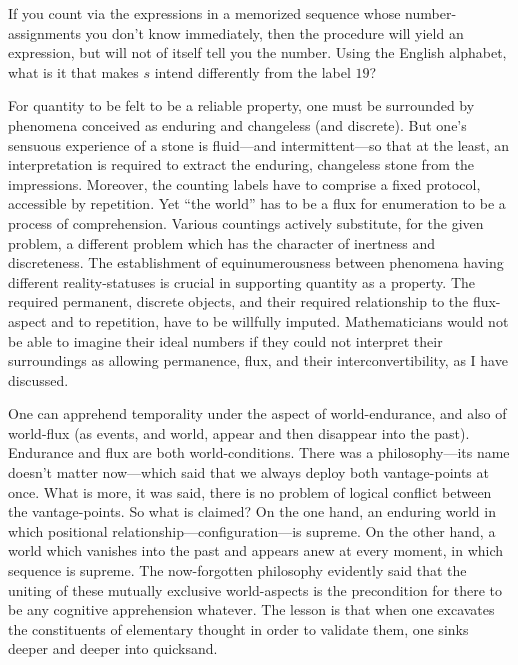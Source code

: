 If you count via the expressions in a memorized sequence whose number-assignments you don't know immediately, then the procedure will yield an expression, but will not of itself tell you the number. Using the English alphabet, what is it that makes $s$ intend differently from the label $19$?

For quantity to be felt to be a reliable property, one must be surrounded by phenomena conceived as enduring and changeless (and discrete). But one's sensuous experience of a stone is fluid---and intermittent---so that at the least, an interpretation is required to extract the enduring, changeless stone from the impressions. Moreover, the counting labels have to comprise a fixed protocol, accessible by repetition. Yet \enquote{the world} has to be a flux for enumeration to be a process of comprehension. Various countings actively substitute, for the given problem, a different problem which has the character of inertness and discreteness. The establishment of equinumerousness between phenomena having different reality-statuses is crucial in supporting quantity as a property. The required permanent, discrete objects, and their required relationship to the flux-aspect and to repetition, have to be willfully imputed. Mathematicians would not be able to imagine their ideal numbers if they could not interpret their surroundings as allowing permanence, flux, and their interconvertibility, as I have discussed.

\jarule

One can apprehend temporality under the aspect of world-endurance, and also of world-flux (as events, and world, appear and then disappear into the past). Endurance and flux are both  world-conditions. There was a philosophy---its name doesn't matter now---which said that we always deploy both vantage-points at once. What is more, it was said, there is no problem of logical conflict between the vantage-points. So what is claimed? On the one hand, an enduring world in which positional relationship---configuration---is supreme. On the other hand, a world which vanishes into the past and appears anew at every moment, in which sequence is supreme. The now-forgotten philosophy evidently said that the uniting of these mutually exclusive world-aspects is the precondition for there to be any cognitive apprehension whatever. The lesson is that when one excavates the constituents of elementary thought in order to validate them, one sinks deeper and deeper into quicksand.

\jarule

